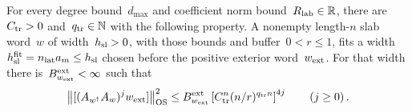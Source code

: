 \begin{lemma}\label{lem:F-repetition}
For every degree bound~$d_{\max}$ and coefficient norm bound~$R_{\rm lab}\in\mathbb{R}$, there are~$C_{\rm tr}>0$ and~$q_{\rm tr}\in\mathbb{N}$ with the following property. A nonempty length-$n$ slab word~$w$ of width~$h_{\rm sl}>0$, with those bounds and buffer~$0<r\le1$, fits a width~$h_{\rm sl}^{\rm fit}=n_{\rm lat}a_m\le h_{\rm sl}$ chosen before the positive exterior word~$w_{\rm ext}$. For that width there is~$B_{w_{\rm ext}}^{\rm ext}<\infty$ such that
\begin{equation}\label{eq:F-repetition}
\big\|[(A_{w^\dagger}A_w)^jw_{\rm ext}]\big\|_{\rm OS}^2
\le B_{w_{\rm ext}}^{\rm ext}\left[C_{\rm tr}^{n}(n/r)^{q_{\rm tr}n}\right]^{4j}\qquad(j\ge0)\,.
\end{equation}
\end{lemma}

